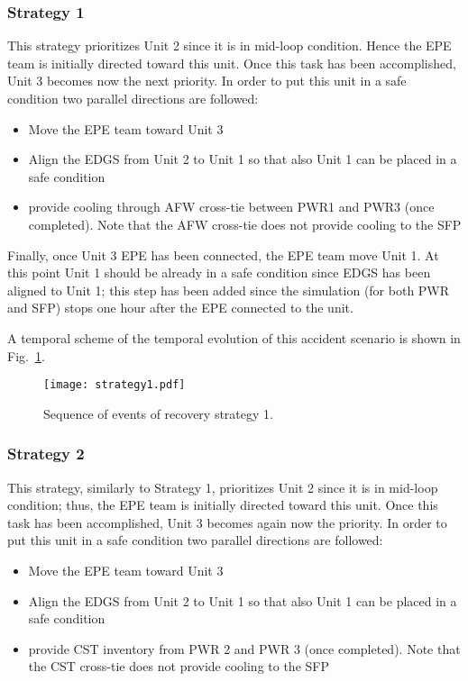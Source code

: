\subsubsection{Strategy 1}
\label{sec:strategy1}
This strategy prioritizes Unit 2 since it is in mid-loop condition. Hence the EPE team is initially directed toward
this unit. 
Once this task has been accomplished, Unit 3 becomes now the next priority. In order to put this unit in a safe 
condition two parallel directions are followed:

\begin{itemize}
  \item Move the EPE team toward Unit 3 
  \item Align the EDGS from Unit 2 to Unit 1 so that also Unit 1 can be placed in a safe condition
  \item provide cooling 
        through AFW cross-tie between PWR1 and PWR3 (once completed). Note that the AFW cross-tie does not provide 
        cooling to the SFP
\end{itemize}

Finally, once Unit 3 EPE has been connected, the EPE team move Unit 1. At this point Unit 1 should be already in a 
safe condition since EDGS has been aligned to Unit 1; this step has been added since the simulation (for 
both PWR and SFP) stops one hour after the EPE connected to the unit.

A temporal scheme of the temporal evolution of this accident scenario is shown in Fig.~\ref{fig:strategy1Scheme}.   

\begin{figure}
    \centering
    \centerline{\texttt{[image: strategy1.pdf]}}
    \caption{Sequence of events of recovery strategy 1.}
    \label{fig:strategy1Scheme}
\end{figure}

\subsubsection{Strategy 2}
\label{sec:strategy2}

This strategy, similarly to Strategy 1, prioritizes Unit 2 since it is in mid-loop condition; thus, the EPE 
team is initially directed toward this unit. 
Once this task has been accomplished, Unit 3 becomes again now the priority. In order to put this unit in a safe 
condition two parallel directions are followed:

\begin{itemize}
  \item Move the EPE team toward Unit 3 
  \item Align the EDGS from Unit 2 to Unit 1 so that also Unit 1 can be placed in a safe condition
  \item provide 
        CST inventory from PWR 2 and PWR 3 (once completed). Note that the CST cross-tie does not provide cooling 
        to the SFP
\end{itemize}

